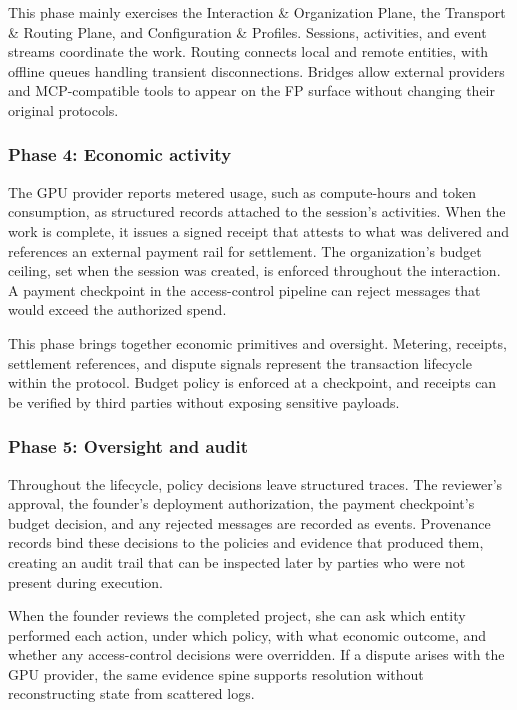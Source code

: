 This phase mainly exercises the Interaction \& Organization Plane, the Transport \& Routing Plane, and Configuration \& Profiles. Sessions, activities, and event streams coordinate the work. Routing connects local and remote entities, with offline queues handling transient disconnections. Bridges allow external providers and MCP-compatible tools to appear on the FP surface without changing their original protocols.

\subsubsection{Phase 4: Economic activity}

The GPU provider reports metered usage, such as compute-hours and token consumption, as structured records attached to the session's activities. When the work is complete, it issues a signed receipt that attests to what was delivered and references an external payment rail for settlement. The organization's budget ceiling, set when the session was created, is enforced throughout the interaction. A payment checkpoint in the access-control pipeline can reject messages that would exceed the authorized spend.

This phase brings together economic primitives and oversight. Metering, receipts, settlement references, and dispute signals represent the transaction lifecycle within the protocol. Budget policy is enforced at a checkpoint, and receipts can be verified by third parties without exposing sensitive payloads.

\subsubsection{Phase 5: Oversight and audit}

Throughout the lifecycle, policy decisions leave structured traces. The reviewer's approval, the founder's deployment authorization, the payment checkpoint's budget decision, and any rejected messages are recorded as events. Provenance records bind these decisions to the policies and evidence that produced them, creating an audit trail that can be inspected later by parties who were not present during execution.

When the founder reviews the completed project, she can ask which entity performed each action, under which policy, with what economic outcome, and whether any access-control decisions were overridden. If a dispute arises with the GPU provider, the same evidence spine supports resolution without reconstructing state from scattered logs.

